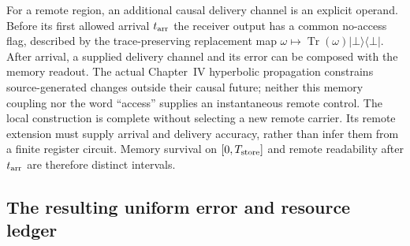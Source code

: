 For a remote region, an additional causal delivery channel is an explicit
operand. Before its first allowed arrival $t_{\rm arr}$ the receiver output
has a common no-access flag, described by the trace-preserving replacement
map $\omega\mapsto\operatorname{Tr}(\omega)|\bot\rangle\langle\bot|$.
After arrival, a supplied delivery channel and its error can be composed
with the memory readout. The actual Chapter~IV hyperbolic propagation
constrains source-generated changes outside their causal future; neither
this memory coupling nor the word ``access'' supplies an instantaneous
remote control. The local construction is complete without selecting a
new remote carrier. Its remote extension must supply arrival and delivery
accuracy, rather than infer them from a finite register circuit.
Memory survival on $[0,T_{\rm store}]$ and remote readability after
$t_{\rm arr}$ are therefore distinct intervals.

\subsection{The resulting uniform error and resource ledger}

